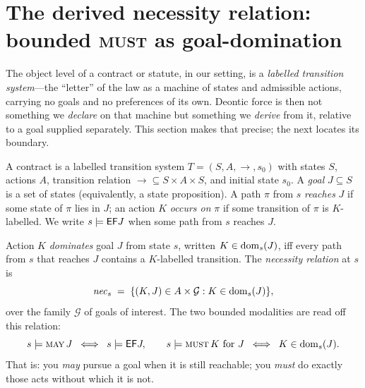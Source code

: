 
\section{The derived necessity relation: bounded \textsc{must} as goal-domination}
\label{sec:nec}

The object level of a contract or statute, in our setting, is a \emph{labelled
transition system}---the ``letter'' of the law as a machine of states and admissible
actions, carrying no goals and no preferences of its own. Deontic force is then not
something we \emph{declare} on that machine but something we \emph{derive} from it,
relative to a goal supplied separately. This section makes that precise; the next
locates its boundary.

\begin{definition}
A contract is a labelled transition system $T=(S,A,{\to},s_0)$ with states $S$, actions
$A$, transition relation ${\to}\subseteq S\times A\times S$, and initial state $s_0$. A
\emph{goal} $J\subseteq S$ is a set of states (equivalently, a state proposition). A path
$\pi$ from $s$ \emph{reaches} $J$ if some state of $\pi$ lies in $J$; an action $K$
\emph{occurs on} $\pi$ if some transition of $\pi$ is $K$-labelled. We write
$s\models\mathsf{EF} J$ when some path from $s$ reaches $J$.
\end{definition}

\begin{definition}
\label{def:dom}
Action $K$ \emph{dominates} goal $J$ from state $s$, written $K\in\operatorname{dom}_s(J)$, iff every
path from $s$ that reaches $J$ contains a $K$-labelled transition. The \emph{necessity
relation} at $s$ is
\[
  \mathit{nec}_s \;=\; \{(K,J)\in A\times \mathcal{G} : K\in\operatorname{dom}_s(J)\},
\]
over the family $\mathcal{G}$ of goals of interest. The two bounded modalities are read
off this relation:
\[
  s\models \textsc{may}\,J \;\;\Longleftrightarrow\;\; s\models \mathsf{EF} J,
  \qquad
  s\models \textsc{must}\,K \text{ for } J \;\;\Longleftrightarrow\;\; K\in\operatorname{dom}_s(J).
\]
That is: you \emph{may} pursue a goal when it is still reachable; you \emph{must} do
exactly those acts without which it is not.
\end{definition}

